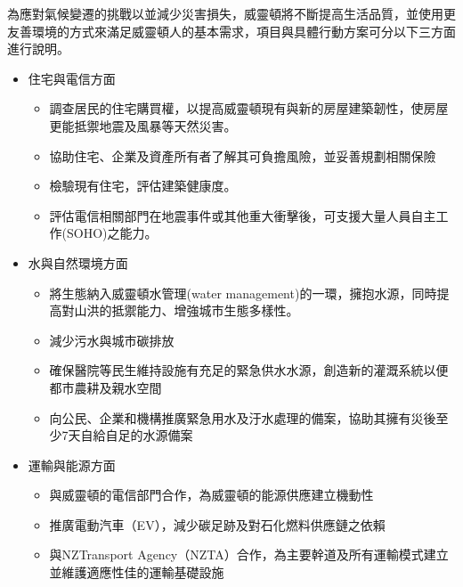 \documentclass[a4paper,12pt]{article}
\begin{document}
\begin{enumerate}
\begin{enumerate}
\begin{enumerate}
為應對氣候變遷的挑戰以並減少災害損失，威靈頓將不斷提高生活品質，並使用更友善環境的方式來滿足威靈頓人的基本需求，項目與具體行動方案可分以下三方面進行說明。\\
\begin{itemize}
\item 住宅與電信方面
\label{sec:orgfe70af6}
\begin{itemize}
\item 調查居民的住宅購買權，以提高威靈頓現有與新的房屋建築韌性，使房屋更能抵禦地震及風暴等天然災害。\\
\item 協助住宅、企業及資產所有者了解其可負擔風險，並妥善規劃相關保險\\
\item 檢驗現有住宅，評估建築健康度。\\
\item 評估電信相關部門在地震事件或其他重大衝擊後，可支援大量人員自主工作(SOHO)之能力。\\
\end{itemize}
\item 水與自然環境方面
\label{sec:org7e9807c}
\begin{itemize}
\item 將生態納入威靈頓水管理(water management)的一環，擁抱水源，同時提高對山洪的抵禦能力、增強城市生態多樣性。\\
\item 減少污水與城市碳排放\\
\item 確保醫院等民生維持設施有充足的緊急供水水源，創造新的灌溉系統以便都市農耕及親水空間\\
\item 向公民、企業和機構推廣緊急用水及汙水處理的備案，協助其擁有災後至少7天自給自足的水源備案\\
\end{itemize}
\item 運輸與能源方面
\label{sec:org6e2799d}
\begin{itemize}
\item 與威靈頓的電信部門合作，為威靈頓的能源供應建立機動性\\
\item 推廣電動汽車（EV），減少碳足跡及對石化燃料供應鏈之依賴\\
\item 與NZTransport Agency（NZTA）合作，為主要幹道及所有運輸模式建立並維護適應性佳的運輸基礎設施\\
\end{itemize}
\end{itemize}
\end{enumerate}


\end{enumerate}
\end{enumerate}
\end{document}
